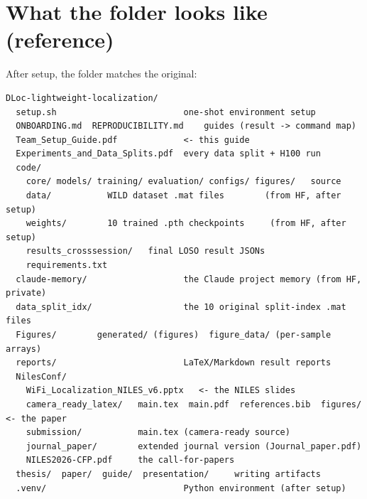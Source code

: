 \documentclass[11pt]{article}
\begin{document}
\section{What the folder looks like (reference)}
After setup, the folder matches the original:
\begin{lstlisting}
DLoc-lightweight-localization/
  setup.sh                         one-shot environment setup
  ONBOARDING.md  REPRODUCIBILITY.md    guides (result -> command map)
  Team_Setup_Guide.pdf             <- this guide
  Experiments_and_Data_Splits.pdf  every data split + H100 run
  code/
    core/ models/ training/ evaluation/ configs/ figures/   source
    data/           WILD dataset .mat files        (from HF, after setup)
    weights/        10 trained .pth checkpoints     (from HF, after setup)
    results_crosssession/   final LOSO result JSONs
    requirements.txt
  claude-memory/                   the Claude project memory (from HF, private)
  data_split_idx/                  the 10 original split-index .mat files
  Figures/        generated/ (figures)  figure_data/ (per-sample arrays)
  reports/                         LaTeX/Markdown result reports
  NilesConf/
    WiFi_Localization_NILES_v6.pptx   <- the NILES slides
    camera_ready_latex/   main.tex  main.pdf  references.bib  figures/   <- the paper
    submission/           main.tex (camera-ready source)
    journal_paper/        extended journal version (Journal_paper.pdf)
    NILES2026-CFP.pdf     the call-for-papers
  thesis/  paper/  guide/  presentation/     writing artifacts
  .venv/                           Python environment (after setup)
\end{lstlisting}

\end{document}
